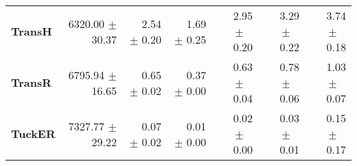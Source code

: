 \documentclass[journal]{IEEEtran}
\begin{document}
\begin{table*}
\begin{tabular}{lrrrrrr}
\textbf{TransH  } &  6320.00 $\pm$ 30.37 &  $\phantom{5}$2.54 $\pm$ 0.20 &  $\phantom{5}$1.69 $\pm$ 0.25 &  $\phantom{5}$2.95 $\pm$ $\phantom{5}$0.20 &  $\phantom{5}$3.29 $\pm$ $\phantom{5}$0.22 &  $\phantom{5}$3.74 $\pm$ $\phantom{5}$0.18 \\
\textbf{TransR  } &  6795.94 $\pm$ 16.65 &  $\phantom{5}$0.65 $\pm$ 0.02 &  $\phantom{5}$0.37 $\pm$ 0.00 &  $\phantom{5}$0.63 $\pm$ $\phantom{5}$0.04 &  $\phantom{5}$0.78 $\pm$ $\phantom{5}$0.06 &  $\phantom{5}$1.03 $\pm$ $\phantom{5}$0.07 \\
\textbf{TuckER  } &  7327.77 $\pm$ 29.22 &  $\phantom{5}$0.07 $\pm$ 0.02 &  $\phantom{5}$0.01 $\pm$ 0.00 &  $\phantom{5}$0.02 $\pm$ $\phantom{5}$0.00 &  $\phantom{5}$0.03 $\pm$ $\phantom{5}$0.01 &  $\phantom{5}$0.15 $\pm$ $\phantom{5}$0.17 \\
\bottomrule
\end{tabular}

\end{table*}
\end{document}
